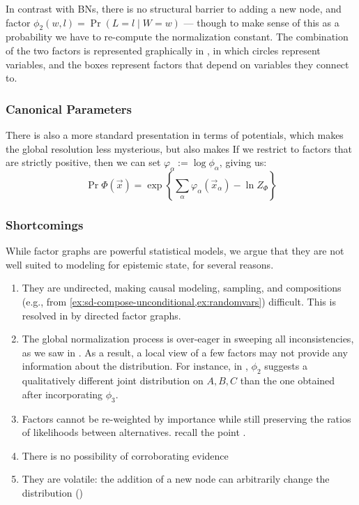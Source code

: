 \documentclass{article}
\numberwithin{equation}{section}
\begin{document}
\begin{notfocus}
\begin{example}
		
		In contrast with BNs, there is no structural barrier to adding a new node, and factor $\phi_2(w,l) \!=\! \Pr(L\!=\!l\mid W\!=\!w)$ --- though to make sense of this as a probability we have to re-compute the normalization constant. The combination of the two factors is represented graphically in , in which circles represent variables, and the boxes represent factors that depend on variables they connect to. 		
	\end{example}

	\subsubsection{Canonical Parameters}
	There is also a more standard presentation in terms of potentials, which makes the global resolution less mysterious, but also makes
	If we restrict to factors that are strictly positive, %
	then we can set $ \varphi_\alpha := \log \phi_\alpha$, giving us:
	\[ \Pr{\Phi} (\vec x)  = \exp \left\{ \sum_\alpha \varphi_\alpha(\vec x_\alpha)  - \ln Z_\Phi \right\} \] 
	
	

	\subsubsection{Shortcomings}

	While factor graphs are powerful statistical models, we argue that they are not well suited to modeling for epistemic state, for several reasons. 

	\begin{enumerate}
		\item They are undirected, making causal modeling, sampling, and compositions (e.g., from \cref{ex:sd-compose-unconditional,ex:randomvars}) difficult. This is resolved in \parencite{frey2012extending} by directed factor graphs. 
		\label{fgproblem:undirected}
		\item The global normalization process is over-eager in sweeping all inconsistencies, as we saw in . As a result, a local view of a few factors may not provide any information about the distribution. For instance, in  , $\phi_2$ suggests a qualitatively different joint distribution on $A,B,C$ than the one obtained after incorporating $\phi_3$. \label{fgproblem:global}
		\item Factors cannot be re-weighted by importance while still preserving the ratios of likelihoods between alternatives. recall the point . \label{fgproblem:reweight}
		\item There is no possibility of corroborating evidence \label{fgproblem:corrob}
		\item They are volatile: the addition of a new node can arbitrarily change the distribution \label{fgproblem:volatile} ()
	\end{enumerate}



\end{notfocus}
\end{document}
